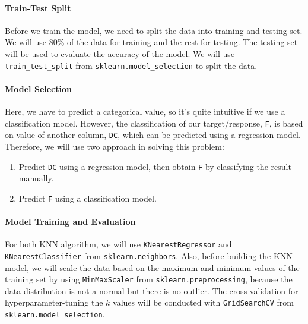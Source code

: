 \documentclass[conf]{new-aiaa}
\begin{document}
\paragraph{Train-Test Split} Before we train the model, we need to split the data into training and testing set. We will use 80\% of the data for training and the rest for testing. The testing set will be used to evaluate the accuracy of the model. We will use \texttt{train\_test\_split} from \texttt{sklearn.model\_selection} to split the data. 

\paragraph{Model Selection}
Here, we have to predict a categorical value, so it's quite intuitive if we use a classification model. However, the classification of our target/response, \texttt{F}, is based on value of another column, \texttt{DC}, which can be predicted using a regression model. Therefore, we will use two approach in solving this problem:
\begin{enumerate}
    \item Predict \texttt{DC} using a regression model, then obtain \texttt{F} by classifying the result manually.
    \item Predict \texttt{F} using a classification model.
\end{enumerate}

\paragraph{Model Training and Evaluation}
For both KNN algorithm, we will use \texttt{KNearestRegressor} and \texttt{KNearestClassifier} from \texttt{sklearn.neighbors}. Also, before building the KNN model, we will scale the data based on the maximum and minimum values of the training set by using \texttt{MinMaxScaler} from \texttt{sklearn.preprocessing}, because the data distribution is not a normal but there is no outlier. The cross-validation for hyperparameter-tuning the $k$ values will be conducted with \texttt{GridSearchCV} from \texttt{sklearn.model\_selection}. 
\end{document}
